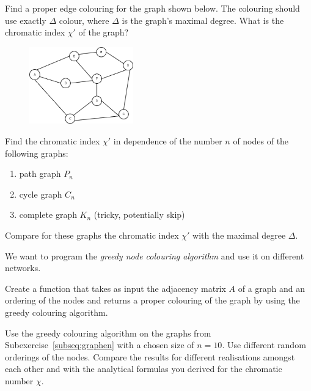     
\clearpage 
\exercise[%
  topic =Edge Colouring 
    ]

\subexercise[%
  topic=Edge Colouring of a Graph,
    ]

Find a proper edge colouring for the graph shown below. The colouring
should use exactly $\Delta$ colour, where $\Delta$ is the graph's maximal
degree. What is the chromatic index $\chi'$ of the graph?

\begin{figure}[h]
\includegraphics[width=0.4\textwidth]{graph_colouring.eps}
\end{figure}

\subexercise[%
  topic=Edge colouring of Graph Models,
    ]

Find the  chromatic index  $\chi'$ in dependence of the number $n$ of nodes of the following graphs:   

\begin{enumerate}
\item path graph $P_n$
\item cycle graph $C_n$
\item complete graph $K_n$ (tricky, potentially skip)
\end{enumerate}

Compare for these graphs the chromatic index  $\chi'$  with the maximal degree $\Delta$.

\exercise[%
  topic = Coding the Greedy Colouring
    ]

We want to program the \emph{greedy node colouring algorithm} and use it on different networks.

\subexercise[%
  topic=Greedy Colouring,
    ]
    
    
    Create a function that takes as input the adjacency matrix $A$ of a
    graph and an ordering of the nodes and returns a proper colouring of
    the graph by using the greedy colouring algorithm. 
    

\subexercise[%
  topic=Greedy Colouring of Graph Models,
    ]
    
Use the greedy colouring algorithm on the graphs from Subexercise~\ref{subseq:graphen} with a chosen size of $n=10$. Use different random orderings of the nodes. Compare the results for different realisations amongst each other and with the analytical formulas you derived for the chromatic number $\chi$.
    
